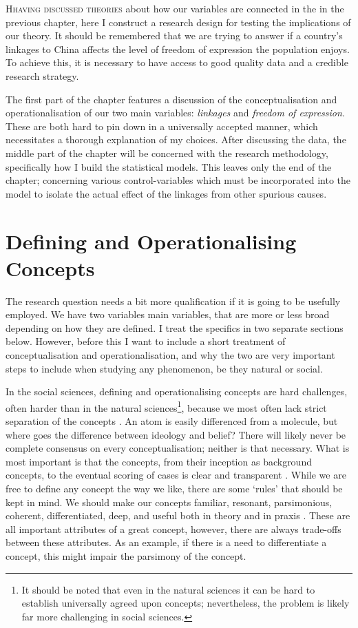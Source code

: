 \lettrine{H}{having discussed theories} about how our variables are connected in the in the previous chapter, here I construct a research design for testing the implications of our theory.  It should be remembered that we are trying to answer if a country's linkages to China affects the level of freedom of expression the population enjoys. To achieve this, it is necessary to have access to good quality data and a credible research strategy.

The first part of the chapter features a discussion of the conceptualisation and operationalisation of our two main variables: \textit{linkages} and \textit{freedom of expression}. These are both hard to pin down in a universally accepted manner, which necessitates a thorough explanation of my choices. After discussing the data, the middle part of the chapter will be concerned with the research methodology, specifically how I build the statistical models. This leaves only the end of the chapter; concerning various control-variables which must be incorporated into the model to isolate the actual effect of the linkages from other spurious causes. 

\section{Defining and Operationalising Concepts}
The research question needs a bit more qualification if it is going to be usefully employed. We have two variables main variables, that are more or less broad depending on how they are defined. I treat the specifics in two separate sections below. However, before this I want to include a short treatment of conceptualisation and operationalisation, and why the two are very important steps to include when studying any phenomenon, be they natural or social. 

In the social sciences, defining and operationalising concepts are hard challenges, often harder than in the natural sciences\footnote{It should be noted that even in the natural sciences it can be hard to establish universally agreed upon concepts; nevertheless, the problem is likely far more challenging in social sciences.}, because we most often lack strict separation of the concepts  \citep[for a brief discussion, see:][pp. 360, 392-393]{gerring_what_1999}. An atom is easily differenced from a molecule, but where goes the difference between ideology and belief? There will likely never be complete consensus on every conceptualisation; neither is that necessary. What is most important is that the concepts, from their inception as background concepts, to the eventual scoring of cases is clear and transparent \citep[p. 531]{adcock_measurement_2001}. While we are free to define any concept the way we like, there are some `rules' that should be kept in mind. We should make our concepts familiar, resonant, parsimonious, coherent, differentiated, deep, and useful both in theory and in praxis \citep{gerring_what_1999}. These are all important attributes of a great concept, however, there are always trade-offs between these attributes. As an example, if there is a need to differentiate a concept, this might impair the parsimony of the concept. 

